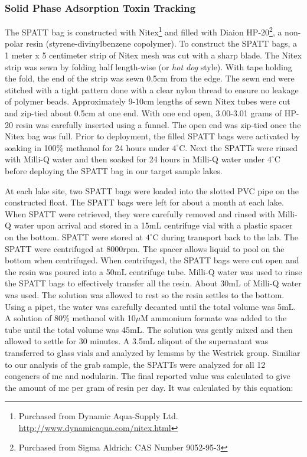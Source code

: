 \subsubsection{Solid Phase Adsorption Toxin Tracking}

The SPATT bag is constructed with Nitex\footnote{Purchased from Dynamic Aqua-Supply Ltd.  \url{http://www.dynamicaqua.com/nitex.html}} and filled with Diaion\texttrademark \: HP-20\footnote{Purchased from Sigma Aldrich: CAS Number 9052-95-3}, a non-polar resin (styrene-divinylbenzene copolymer). To construct the SPATT bags, a 1 meter x 5 centimeter strip of Nitex mesh was cut with a sharp blade. The Nitex strip was sewn by folding half length-wise (or \emph{hot dog} style). With tape holding the fold, the end of the strip was sewn 0.5cm from the edge. The sewn end were stitched with a tight pattern done with a clear nylon thread to ensure no leakage of polymer beads. Approximately 9-10cm lengths of sewn Nitex tubes were cut and zip-tied about 0.5cm at one end. With one end open, 3.00-3.01 grams of HP-20 resin was carefully inserted using a funnel. The open end was zip-tied once the Nitex bag was full. Prior to deployment, the filled SPATT bags were activated by soaking in 100\% methanol for 24 hours under $4^\circ$C. Next the SPATTs were rinsed with Milli-Q water and then soaked for 24 hours in Milli-Q water under $4^\circ$C before deploying the SPATT bag in our target sample lakes.

At each lake site, two SPATT bags were loaded into the slotted PVC pipe on the constructed float. The SPATT bags were left for about a month at each lake. When SPATT were retrieved, they were carefully removed and rinsed with Milli-Q water upon arrival and stored in a 15mL centrifuge vial with a plastic spacer on the bottom. SPATT were stored at $4^\circ$C during transport back to the lab. The SPATT were centrifuged at 8000rpm. The spacer allows liquid to pool on the bottom when centrifuged. When centrifuged, the SPATT bags were cut open and the resin was poured into a 50mL centrifuge tube. Milli-Q water was used to rinse the SPATT bags to effectively transfer all the resin. About 30mL of Milli-Q water was used. The solution was allowed to rest so the resin settles to the bottom. Using a pipet, the water was carefully decanted until the total volume was 5mL.  A solution of 80\% methanol with 10$\mu$M ammonium formate was added to the tube until the total volume was 45mL. The solution was gently mixed and then allowed to settle for 30 minutes. A 3.5mL aliqout of the supernatant was transferred to glass vials and analyzed by \gls{lcmsms} by the Westrick group. Similiar to our analysis of the grab sample, the SPATTs were analyzed for all 12 congeners of \gls{mc} and nodularin. The final reported value was calculated to give the amount of \gls{mc} per gram of resin per day. It was calculated by this equation:

